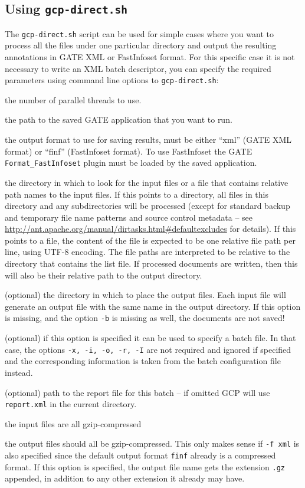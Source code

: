 \subsection{Using {\tt gcp-direct.sh}}
\label{sec:running:gcp-direct}

The \verb!gcp-direct.sh! script can be used for simple cases where you want to
process all the files under one particular directory and output the resulting
annotations in GATE XML or FastInfoset format.  For this specific case it is
not necessary to write an XML batch descriptor, you can specify the required
parameters using command line options to \verb!gcp-direct.sh!:

\bde
\item[-t] the number of parallel threads to use.
\item[-x] the path to the saved GATE application that you want to run.
\item[-f] the output format to use for saving results, must be either ``xml''
  (GATE XML format) or ``finf'' (FastInfoset format).  To use FastInfoset the
  GATE \verb!Format_FastInfoset! plugin must be loaded by the saved
  application.
\item[-i] the directory in which to look for the input files or a file that contains
  relative path names to the input files. If this points to a directory, all files in
  this directory and any subdirectories will be processed (except for standard
  backup and temporary file name patterns and source control metadata -- see
  \url{http://ant.apache.org/manual/dirtasks.html#defaultexcludes} for
  details). If this points to a file, the content of the file is expected to be 
  one relative file path per line, using UTF-8 encoding. The file paths are 
  interpreted to be relative to the directory that contains the list file.
  If processed documents are written, then this will also be their relative 
  path to the output directory. 
\item[-o] (optional) the directory in which to place the output files.  Each input file
  will generate an output file with the same name in the output directory.
  If this option is missing, and the option \texttt{-b} is missing as well,
  the documents are not saved!
\item[-b] (optional) if this option is specified it can be used to specify
  a batch file. In that case, the options \texttt{-x, -i, -o, -r, -I} are 
  not required and ignored if specified and the corresponding information is
  taken from the batch configuration file instead.
\item[-r] (optional) path to the report file for this batch -- if omitted
  GCP will use \verb!report.xml! in the current directory.
\item[-ci] the input files are all gzip-compressed
\item[-co] the output files should all be gzip-compressed. This only makes
sense if \verb!-f xml! is also specified since the default output format
\verb!finf! already is a compressed format. If this option is specified, the
output file name gets the extension \verb!.gz! appended, in addition to 
any other extension it already may have.
\ede

